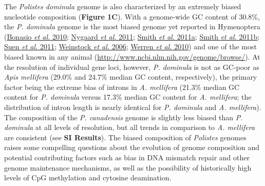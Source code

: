 \documentclass[]{article}
\begin{document}
The \emph{Polistes dominula} genome is also characterized by an
extremely biased nucleotide composition (\textbf{Figure 1C}). With a
genome-wide GC content of 30.8\%, the \emph{P. dominula} genome is the
most biased genome yet reported in Hymenoptera
(\protect\hyperlink{ux5fENREFux5f5}{Bonasio \emph{et al.} 2010};
\protect\hyperlink{ux5fENREFux5f37}{Nygaard \emph{et al.} 2011};
\protect\hyperlink{ux5fENREFux5f54}{Smith \emph{et al.} 2011a};
\protect\hyperlink{ux5fENREFux5f55}{Smith \emph{et al.} 2011b};
\protect\hyperlink{ux5fENREFux5f57}{Suen \emph{et al.} 2011};
\protect\hyperlink{ux5fENREFux5f69}{Weinstock \emph{et al.} 2006};
\protect\hyperlink{ux5fENREFux5f70}{Werren \emph{et al.} 2010}) and one
of the most biased known in any animal
(\url{http://www.ncbi.nlm.nih.gov/genome/browse/}). At the resolution of
individual gene loci, however, \emph{P. dominula} is not as GC-poor as
\emph{Apis mellifera} (29.0\% and 24.7\% median GC content,
respectively), the primary factor being the extreme bias of introns in
\emph{A. mellifera} (21.3\% median GC content for \emph{P. dominula}
versus 17.3\% median GC content for \emph{A. mellifera}; the
distribution of intron length is nearly identical for \emph{P. dominula}
and \emph{A. mellifera}). The composition of the \emph{P. canadensis}
genome is slightly less biased than \emph{P. dominula} at all levels of
resolution, but all trends in comparison to \emph{A. mellifera} are
consistent (see \textbf{SI Results}). The biased composition of
\emph{Polistes} genomes raises some compelling questions about the
evolution of genome composition and potential contributing factors such
as bias in DNA mismatch repair and other genome maintenance mechanisms,
as well as the possibility of historically high levels of CpG
methylation and cytosine deamination.
\end{document}
